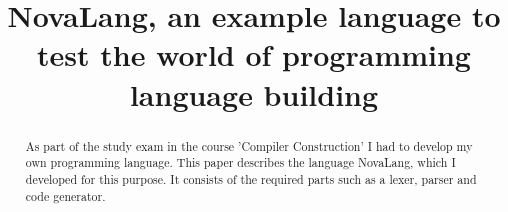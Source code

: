 \documentclass[conference]{IEEEtran}
\begin{document}
\title{NovaLang, an example language to test the world of programming language building}

\author{}

\maketitle

\begin{abstract}
    As part of the study exam in the course 'Compiler Construction' I had to develop my own programming language.
    This paper describes the language NovaLang, which I developed for this purpose.
    It consists of the required parts such as a lexer, parser and code generator.
\end{abstract}
\end{document}
